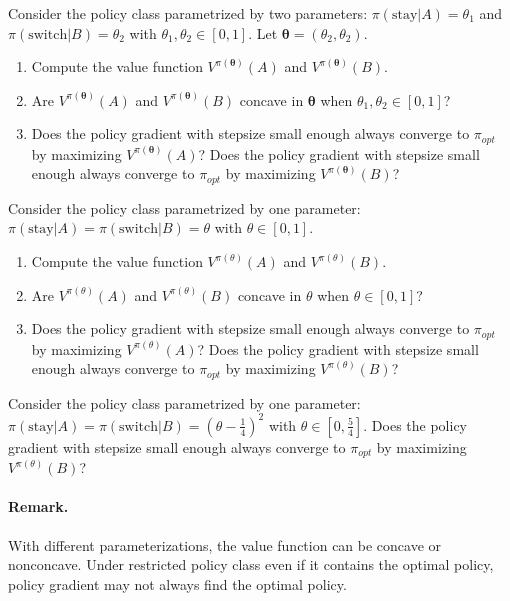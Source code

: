 \begin{questions}
    \question[10] Consider the policy class parametrized by two parameters: $\pi(\text{stay} | A) = \theta_1$ and $\pi(\text{switch} | B) = \theta_2$ with $\theta_1, \theta_2\in[0,1]$. Let $\boldsymbol{\theta} = (\theta_2, \theta_2)$. 
    \begin{enumerate}
        \item Compute the value function $V^{\pi(\boldsymbol{\theta})}(A)$ and  $V^{\pi(\boldsymbol{\theta})}(B)$.
        \item  Are $V^{\pi(\boldsymbol{\theta})}(A)$ and $V^{\pi(\boldsymbol{\theta})}(B)$ concave in $\boldsymbol{\theta}$ when $\theta_1, \theta_2\in[0,1]$?
        \item Does the policy gradient with stepsize small enough always converge to $\pi_{opt}$  by maximizing $V^{\pi(\boldsymbol{\theta})}(A)$? Does the policy gradient with stepsize small enough always converge to $\pi_{opt}$  by maximizing $V^{\pi(\boldsymbol{\theta})}(B)$?
    \end{enumerate}
    \question[10] Consider the policy class parametrized by one parameter: $\pi(\text{stay} | A) = \pi(\text{switch} | B) = \theta$ with $\theta\in[0,1]$.  
    \begin{enumerate}
        \item Compute the value function $V^{\pi(\theta)}(A)$ and  $V^{\pi(\theta)}(B)$.
        \item Are $V^{\pi(\theta)}(A)$ and $V^{\pi(\theta)}(B)$ concave in $\theta$ when $\theta\in[0,1]$? 
        \item Does the policy gradient with stepsize small enough always converge to $\pi_{opt}$ by maximizing $V^{\pi(\theta)}(A)$? Does the policy gradient with stepsize small enough always  converge to $\pi_{opt}$  by maximizing $V^{\pi(\theta)}(B)$?
    \end{enumerate}
    \question[5] Consider the policy class parametrized by one parameter: $\pi(\text{stay} | A) = \pi(\text{switch} | B) = \left(\theta-\frac{1}{4}\right)^2$ with $\theta\in[0,\frac{5}{4}]$. Does the policy gradient with stepsize small enough always converge to $\pi_{opt}$  by maximizing $V^{\pi(\theta)}(B)$?
\end{questions}

\paragraph{Remark.} With different parameterizations, the value function can be concave or nonconcave. Under restricted policy class even if it contains the optimal policy, policy gradient may not always find the optimal policy.\\



